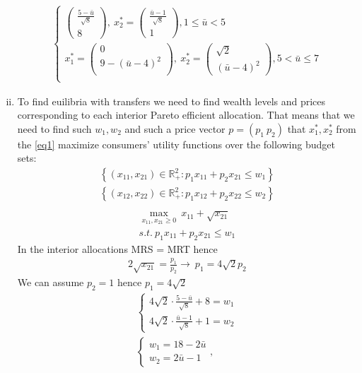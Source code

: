 \documentclass[a4paper]{article}
\begin{document}
\begin{enumerate}[(i)]
\begin{align}
\begin{cases}
	\begin{pmatrix}
	\frac{5 - \bar{u}}{\sqrt{8}}\\
	8
	\end{pmatrix},\ x^*_2 = \begin{pmatrix}
	 \frac{\bar{u}- 1}{\sqrt{8}}\\
	 1
	\end{pmatrix}, 1 \le \bar{u} < 5\\
	x^*_1 = 
	\begin{pmatrix}
	0\\
	9 - (\bar{u} - 4)^2\\
	\end{pmatrix},\ x^*_2 = \begin{pmatrix}
	\sqrt{2}\\
	(\bar{u} - 4)^2
	\end{pmatrix}, 5 < \bar{u} \le 7\\
	\end{cases}
	\end{align}
	\item To find euilibria with transfers we need to find wealth levels and prices corresponding to each interior Pareto efficient allocation. That means that we need to find such $w_1, w_2$ and such a price vector $p = (p_1\ p_2)$ that $x^*_1, x^*_2$ from the \eqref{eq1} maximize consumers' utility functions over the following budget sets:
	\begin{align*}
	\left\{(x_{11}, x_{21}) \in \mathbb{R}^2_{+}: p_1x_{11} + p_2x_{21} \le w_1\right\}\\	\left\{(x_{12}, x_{22}) \in \mathbb{R}^2_{+}: p_1x_{12} + p_2x_{22} \le w_2\right\}\\
	\end{align*}
	\begin{align*}
	\underset{x_{11}, x_{21} \ge 0}{\max}\ x_{11} + \sqrt{x_{21}}\\
	 s.t.\ p_1x_{11} + p_2x_{21} \le w_1
	\end{align*}
	In the interior allocations MRS = MRT hence
	\begin{align*}
	2\sqrt{x_{21}} = \frac{p_1}{p_2} \to\ p_1 = 4\sqrt{2}p_2
	\end{align*}
	We can assume $p_2 = 1$ hence $p_1 = 4\sqrt{2}$
	\begin{align*}
	\begin{cases}
	4\sqrt{2} \cdot \frac{5 - \bar{u}}{\sqrt{8}} + 8 = w_1\\
	4\sqrt{2} \cdot \frac{\bar{u} - 1}{\sqrt{8}} + 1 = w_2
	\end{cases}\\
	\begin{cases}
	w_1 = 18 - 2\bar{u}\\
	w_2 = 2\bar{u} - 1
	\end{cases}, 
	\end{align*}
\end{enumerate}
\end{document}
